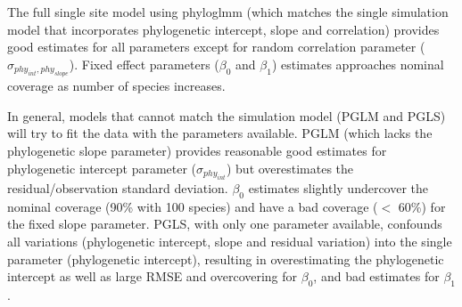 The full single site model using phyloglmm (which matches the single simulation model that incorporates phylogenetic intercept, slope and correlation) provides good estimates for all parameters except for random correlation parameter ($\sigma_{phy_{int},phy_{slope}}$). 
Fixed effect parameters ($\beta_0$ and $\beta_1$) estimates approaches nominal coverage as number of species increases.

In general, models that cannot match the simulation model (PGLM and PGLS) will try to fit the data with the parameters available. 
PGLM (which lacks the phylogenetic slope parameter) provides reasonable good estimates for phylogenetic intercept parameter ($\sigma_{phy_{int}}$) but overestimates the residual/observation standard deviation. 
$\beta_0$ estimates slightly undercover the nominal coverage (90\% with 100 species) and have a bad coverage ($<$ 60\%) for the fixed slope parameter.
PGLS, with only one parameter available, confounds all variations (phylogenetic intercept, slope and residual variation) into the single parameter (phylogenetic intercept), resulting in overestimating the phylogenetic intercept as well as large RMSE and overcovering for $\beta_0$, and bad estimates for $\beta_1$. 




